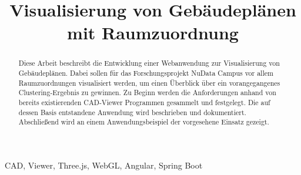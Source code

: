 \documentclass[conference,a4paper]{IEEEtran}
\begin{document}
    \title{Visualisierung von Gebäudeplänen mit Raumzuordnung}

    \author{
    }

    \maketitle

    \begin{abstract}
        Diese Arbeit beschreibt die Entwicklung einer Webanwendung zur Visualisierung von Gebäudeplänen.
        Dabei sollen für das Forschungsprojekt \glqq{}NuData Campus\grqq{} vor allem Raumzuordnungen visualisiert werden, um einen Überblick über ein vorangegangenes Clustering-Ergebnis zu gewinnen.
        Zu Beginn werden die Anforderungen anhand von bereits existierenden CAD-Viewer Programmen gesammelt und festgelegt.
        Die auf dessen Basis entstandene Anwendung wird beschrieben und dokumentiert.
        Abschließend wird an einem Anwendungsbeispiel der vorgesehene Einsatz gezeigt.
    \end{abstract}

    \vspace{10pt}

    \begin{IEEEkeywords}
        CAD, Viewer, Three.js, WebGL, Angular, Spring Boot
    \end{IEEEkeywords}


    

    

    

    


    
    
\end{document}
